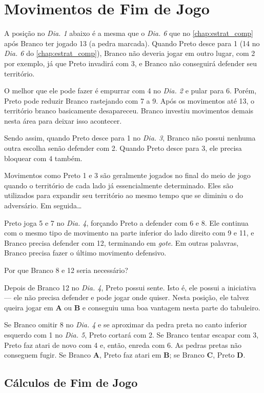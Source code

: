 \chapter{Movimentos de Fim de Jogo}

A posição no \emph{Dia. 1} abaixo é a mesma que o \emph{Dia. 6} que no \autoref{chap:estrat_comp} após Branco ter jogado 13 (a pedra marcada). Quando Preto desce para 1 (14 no \emph{Dia. 6} do \autoref{chap:estrat_comp}), Branco não deveria jogar em outro lugar, com 2 por exemplo, já que Preto invadirá com 3, e Branco não conseguirá defender seu território.

O melhor que ele pode fazer é empurrar com 4 no \emph{Dia. 2} e pular para 6. Porém, Preto pode reduzir Branco rastejando com 7 a 9. Após os movimentos até 13, o território branco basicamente desapareceu. Branco investiu movimentos demais nesta área para deixar isso acontecer.

Sendo assim, quando Preto desce para 1 no \emph{Dia. 3}, Branco não possui nenhuma outra escolha senão defender com 2. Quando Preto desce para 3, ele precisa bloquear com 4 também.

Movimentos como Preto 1 e 3 são geralmente jogados no final do meio de jogo quando o território de cada lado já essencialmente determinado. Eles são utilizados para expandir seu território ao mesmo tempo que se diminiu o do adversário. Em seguida\ldots

Preto joga 5 e 7 no \emph{Dia. 4}, forçando Preto a defender com 6 e 8. Ele continua com o mesmo tipo de movimento na parte inferior do lado direito com 9 e 11, e Branco precisa defender com 12, terminando em \emph{gote}. Em outras palavras, Branco precisa fazer o último movimento defensivo.

Por que Branco 8 e 12 seria necessário?

Depois de Branco 12 no \emph{Dia. 4}, Preto possui sente. Isto é, ele possui a iniciativa --- ele não precisa defender e pode jogar onde quiser. Nesta posição, ele talvez queira jogar em \textbf{A} ou \textbf{B} e conseguiu uma boa vantagem nesta parte do tabuleiro.

Se Branco omitir 8 no \emph{Dia. 4} e se aproximar da pedra preta no canto inferior esquerdo com 1 no \emph{Dia. 5}, Preto cortará com 2. Se Branco tentar escapar com 3, Preto faz atari de novo com 4 e, então, enreda com 6. As pedras pretas não conseguem fugir. Se Branco \textbf{A}, Preto faz atari em \textbf{B}; se Branco \textbf{C}, Preto \textbf{D}.

\section{Cálculos de Fim de Jogo}

